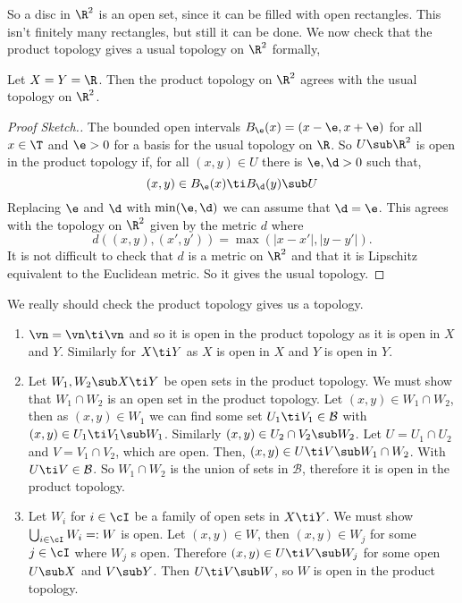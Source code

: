 \noindent
So a disc in $\R^2$ is an open set, since it can be filled with open rectangles. This isn't finitely many rectangles, but still it can be done. We now check that the product topology gives a usual topology on $\R^2$ formally,
\begin{nlemma}
  Let $X = Y = \R$. Then the product topology on $\R^2$ agrees with the usual topology on $\R^2$.
\end{nlemma}
\begin{proof}[Proof Sketch.]
  The bounded open intervals $B_\e(x) = (x - \e, x + \e)$ for all $x \in \T$ and $\e > 0$ for a basis for the usual topology on $\R$. So $U \sub \R^2$ is open in the product topology if, for all $(x, y) \in U$ there is $\e, \d > 0 $ such that,
  $$ (x, y) \in B_\e(x) \ti B_\d(y) \sub U $$
  Replacing $\e$ and $\d$ with $\min (\e, \d)$ we can assume that $\d = \e$. This agrees with the topology on $\R^2$ given by the metric $d$ where
  $$ d((x, y), (x', y')) = \max(|x - x'|, |y - y'|). $$
  It is not difficult to check that $d$ is a metric on $\R^2$ and that it is Lipschitz equivalent to the Euclidean metric. So it gives the usual topology.
\end{proof}

\noindent
We really should check the product topology gives us a topology.
\begin{enumerate}
  \item $\vn = \vn \ti \vn$ and so it is open in the product topology as it is open in $X$ and $Y$. Similarly for $X\ti Y$ as $X$ is open in $X$ and $Y$ is open in $Y$.
  \item Let $W_1, W_2 \sub X\ti Y$ be open sets in the product topology. We must show that $W_1 \cap W_2$ is an open set in the product topology. Let $(x, y) \in W_1 \cap W_2$, then as $(x, y) \in W_1$ we can find some set $U_1 \ti V_1 \in \mathcal{B}$ with $(x, y) \in U_1\ti V_1 \sub W_1$. Similarly $(x, y) \in U_2 \cap V_2 \sub W_2$.
  Let $U = U_1 \cap U_2$ and $V = V_1 \cap V_2$, which are open. Then, $(x, y) \in U\ti V \sub W_1 \cap W_2$. With $U \ti V \in \mathcal{B}$. So $W_1 \cap W_2$ is the union of sets in $\mathcal{B}$, therefore it is open in the product topology.
  \item Let $W_i$ for $i \in \cI$ be a family of open sets in $X \ti Y$. We must show $\bigcup_{i \in\cI} W_i =: W$ is open. Let $(x, y) \in W$, then $(x, y) \in W_j$ for some $j \in \cI$ where $W_j$ s open. Therefore $(x, y) \in U \ti V \sub W_j$ for some open $U \sub X$ and $V \sub Y$. Then $U \ti V \sub W$,
  so $W$ is open in the product topology.
\end{enumerate}

